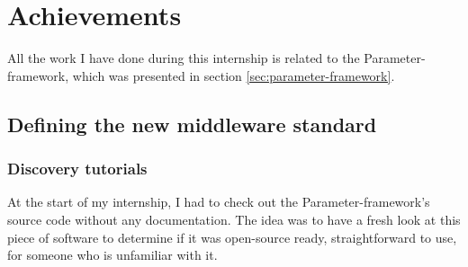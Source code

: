 \chapter{Achievements}

\begin{sectionIntro}
    All the work I have done during this internship is related
    to the Parameter-framework, which was presented in section \ref{sec:parameter-framework}.
\end{sectionIntro}

%
%
%

\section{Defining the new middleware standard}
\subsection{Discovery tutorials}

At the start of my internship, I had to check out the Parameter-framework's
source code without any documentation. The idea was to have a fresh look at
this piece of software to determine if it was open-source ready, straightforward
to use, for someone who is unfamiliar with it.


